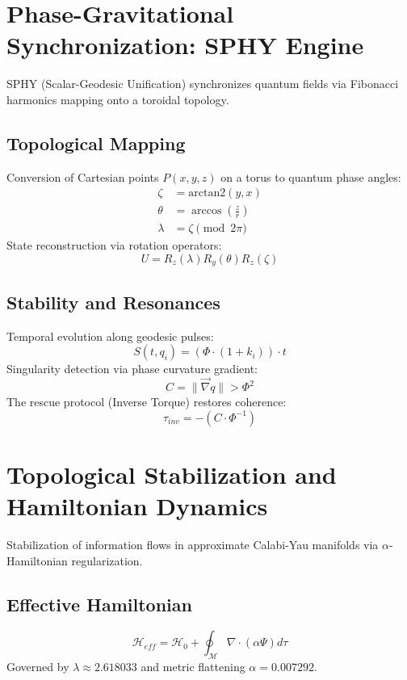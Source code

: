 \documentclass{article}
\begin{document}
\section{Phase-Gravitational Synchronization: SPHY Engine}
SPHY (Scalar-Geodesic Unification) synchronizes quantum fields via Fibonacci harmonics mapping onto a toroidal topology.

\subsection{Topological Mapping}
Conversion of Cartesian points $P(x, y, z)$ on a torus to quantum phase angles:
\begin{align}
    \zeta &= \text{arctan2}(y, x) \\
    \theta &= \arccos\left(\frac{z}{r}\right) \\
    \lambda &= \zeta \pmod{2\pi}
\end{align}
State reconstruction via rotation operators:
\begin{equation}
    U = R_z(\lambda)R_y(\theta)R_z(\zeta)
\end{equation}

\subsection{Stability and Resonances}
Temporal evolution along geodesic pulses:
\begin{equation}
    S(t, q_i) = (\Phi \cdot (1 + k_i)) \cdot t
\end{equation}
Singularity detection via phase curvature gradient:
\begin{equation}
    C = \|\vec{\nabla}q\| > \Phi^2
\end{equation}
The rescue protocol (Inverse Torque) restores coherence:
\begin{equation}
    \tau_{inv} = -(C \cdot \Phi^{-1})
\end{equation}

\section{Topological Stabilization and Hamiltonian Dynamics}
Stabilization of information flows in approximate Calabi-Yau manifolds via $\alpha$-Hamiltonian regularization.

\subsection{Effective Hamiltonian}
\begin{equation}
    \mathcal{H}_{eff} = \mathcal{H}_0 + \oint_{\mathcal{M}} \nabla \cdot (\alpha\Psi) d\tau
\end{equation}
Governed by $\lambda \approx 2.618033$ and metric flattening $\alpha = 0.007292$.
\end{document}
